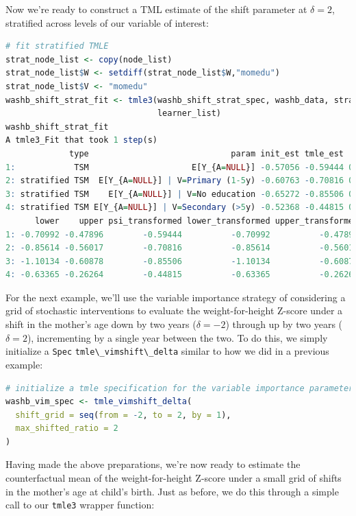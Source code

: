 \documentclass[
  12pt, krantz2,
]{book}
\newcommand{\passthrough}[1]{#1}
\theoremstyle{definition}
\theoremstyle{definition}
\theoremstyle{definition}
\newcommand{\1}{\mathbbm{1}}
\begin{document}
Now we're ready to construct a TML estimate of the shift parameter at
\(\delta = 2\), stratified across levels of our variable of interest:

\begin{lstlisting}[language=R]
# fit stratified TMLE
strat_node_list <- copy(node_list)
strat_node_list$W <- setdiff(strat_node_list$W,"momedu")
strat_node_list$V <- "momedu"
washb_shift_strat_fit <- tmle3(washb_shift_strat_spec, washb_data, strat_node_list,
                               learner_list)
washb_shift_strat_fit
A tmle3_Fit that took 1 step(s)
             type                             param init_est tmle_est       se
1:            TSM                     E[Y_{A=NULL}] -0.57056 -0.59444 0.058920
2: stratified TSM  E[Y_{A=NULL}] | V=Primary (1-5y) -0.60763 -0.70816 0.075504
3: stratified TSM    E[Y_{A=NULL}] | V=No education -0.65272 -0.85506 0.125655
4: stratified TSM E[Y_{A=NULL}] | V=Secondary (>5y) -0.52368 -0.44815 0.094647
      lower    upper psi_transformed lower_transformed upper_transformed
1: -0.70992 -0.47896        -0.59444          -0.70992          -0.47896
2: -0.85614 -0.56017        -0.70816          -0.85614          -0.56017
3: -1.10134 -0.60878        -0.85506          -1.10134          -0.60878
4: -0.63365 -0.26264        -0.44815          -0.63365          -0.26264
\end{lstlisting}

For the next example, we'll use the variable importance strategy of considering
a grid of stochastic interventions to evaluate the weight-for-height Z-score
under a shift in the mother's age down by two years (\(\delta = -2\)) through up
by two years (\(\delta = 2\)), incrementing by a single year between the two. To
do this, we simply initialize a \passthrough{\lstinline!Spec!} \passthrough{\lstinline!tmle\_vimshift\_delta!} similar to how we
did in a previous example:

\begin{lstlisting}[language=R]
# initialize a tmle specification for the variable importance parameter
washb_vim_spec <- tmle_vimshift_delta(
  shift_grid = seq(from = -2, to = 2, by = 1),
  max_shifted_ratio = 2
)
\end{lstlisting}

Having made the above preparations, we're now ready to estimate the
counterfactual mean of the weight-for-height Z-score under a small grid of
shifts in the mother's age at child's birth. Just as before, we do this through
a simple call to our \passthrough{\lstinline!tmle3!} wrapper function:
\end{document}
